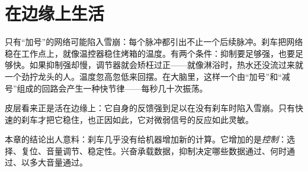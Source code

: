 \section*{在边缘上生活}

只有“加号”的网络可能陷入雪崩：每个脉冲都引出不止一个后续脉冲。刹车把网络稳在工作点上，就像温控器稳住烤箱的温度。有两个条件：抑制要足够强，也要足够快。如果抑制强却慢，调节器就会矫枉过正——就像淋浴时，热水还没流过来就一个劲拧龙头的人。温度忽高忽低来回摆。在大脑里，这样一个由“加号”和“减号”组成的回路会产生一种快节律——每秒几十次振荡。

皮层看来正是活在边缘上：它自身的反馈强到足以在没有刹车时陷入雪崩。只有快速的刹车才把它稳住，也正因如此，它对微弱信号的反应如此灵敏。

本章的结论出人意料：刹车几乎没有给机器增加新的计算。它增加的是\emph{控制}：选择、复位、音量调节、稳定性。兴奋承载数据，抑制决定哪些数据通过、何时通过、以多大音量通过。

